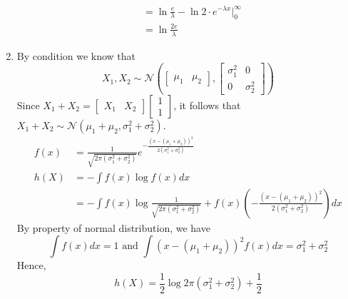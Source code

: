 \begin{exercise}
\begin{solution}
\begin{enumerate}
\begin{equation}
\begin{aligned}
        &= \ln \frac{e}{\lambda} - \ln 2 \cdot e^{-\lambda x} \bigg| ^{\infty}_{0} \\
        &= \ln \frac{2e}{\lambda}
      \end{aligned}
    \end{equation}
    \item By condition we know that
    \begin{equation}
      X_1, X_2 \sim \mathcal{N}\left(
        \left[\begin{array}{cc}
          \mu_1 & \mu_2 
        \end{array}\right], 
        \left[\begin{array}{cc}
          \sigma_1^{2} & 0 \\
           0 & \sigma_2^{2}
        \end{array}\right]\right)
    \end{equation}
    Since $X_1 + X_2 = \left[\begin{array}
      {cc} X_1 & X_2
    \end{array}\right] \left[\begin{array}
      {c} 1 \\ 1
    \end{array}\right]$, it follows that $X_1 + X_2 \sim \mathcal{N} (\mu_1 + \mu_2, \sigma_{1}^{2} + \sigma_{2}^{2})$.
    \begin{equation}
      \begin{aligned}
        f(x) &= \frac{1}{\sqrt{2 \pi (\sigma_{1}^{2} + \sigma_{2}^{2})}} e^{-\frac{(x-(\mu_1 + \mu_2))^{2}}{2 (\sigma_{1}^{2} + \sigma_{2}^{2})}} \\        
        h(X)&=-\int f(x) \log f(x) d x \\
        &=-\int f(x) \log \frac{1}{\sqrt{2 \pi (\sigma_{1}^{2} + \sigma_{2}^{2})}}+f(x)\left(-\frac{(x-(\mu_1 + \mu_2))^{2}}{2 (\sigma_{1}^{2} + \sigma_{2}^{2})}\right) d x         
        \end{aligned}      
    \end{equation}
    By property of normal distribution, we have
    \begin{equation}
      \int f(x) d x=1 \text { and } \int(x-(\mu_1 + \mu_2))^{2} f(x) d x=\sigma_{1}^{2} + \sigma_{2}^{2}
    \end{equation}
    Hence, 
    \begin{equation}
      h(X) = \frac{1}{2} \log 2\pi (\sigma_{1}^{2}+\sigma_{2}^{2}) + \frac{1}{2}
    \end{equation}
  \end{enumerate}
  \end{solution}
  \label{ex8-1}
\end{exercise}

